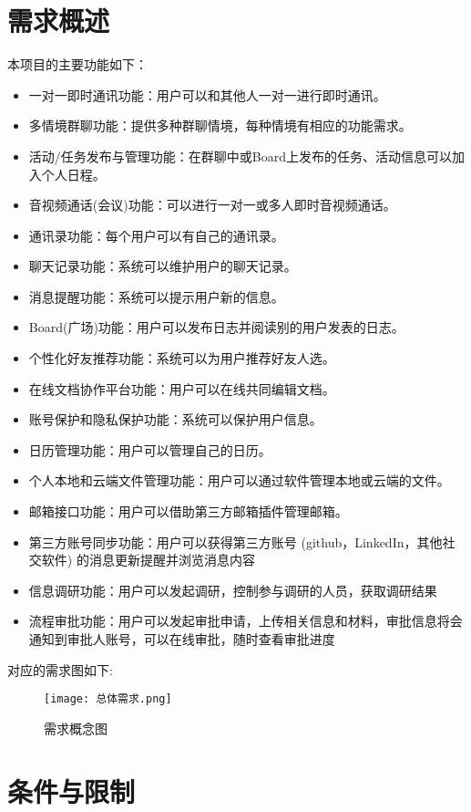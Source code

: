 \section{\color{red}需求概述}
本项目的主要功能如下：
\begin{itemize}
	\item 一对一即时通讯功能：用户可以和其他人一对一进行即时通讯。
	\item 多情境群聊功能：提供多种群聊情境，每种情境有相应的功能需求。
	\item 活动/任务发布与管理功能：在群聊中或Board上发布的任务、活动信息可以加入个人日程。
	\item 音视频通话(会议)功能：可以进行一对一或多人即时音视频通话。
	\item 通讯录功能：每个用户可以有自己的通讯录。
	\item 聊天记录功能：系统可以维护用户的聊天记录。
	\item 消息提醒功能：系统可以提示用户新的信息。
	\item Board(广场)功能：用户可以发布日志并阅读别的用户发表的日志。
	\item 个性化好友推荐功能：系统可以为用户推荐好友人选。
	\item 在线文档协作平台功能：用户可以在线共同编辑文档。
	\item 账号保护和隐私保护功能：系统可以保护用户信息。
	\item 日历管理功能：用户可以管理自己的日历。
	\item 个人本地和云端文件管理功能：用户可以通过软件管理本地或云端的文件。
	\item 邮箱接口功能：用户可以借助第三方邮箱插件管理邮箱。
	\item \color{red} 第三方账号同步功能：用户可以获得第三方账号 (github，LinkedIn，其他社交软件) 的消息更新提醒并浏览消息内容
	\item \color{red} 信息调研功能：用户可以发起调研，控制参与调研的人员，获取调研结果
	\item \color{red} 流程审批功能：用户可以发起审批申请，上传相关信息和材料，审批信息将会通知到审批人账号，可以在线审批，随时查看审批进度
\end{itemize}

对应的需求图如下:
\newpage
\begin{figure}[ht]
            \centering
            \texttt{[image: 总体需求.png]}\label{tab:classification}
            \caption{需求概念图}\label{fig:noted-figure}
        \end{figure}

\section{条件与限制}
